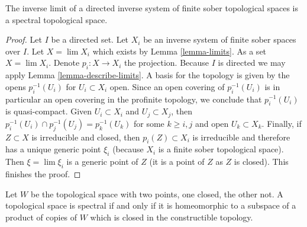 \begin{lemma}
\label{lemma-directed-inverse-limit-finite-sober-spectral-spaces}
The inverse limit of a directed inverse system of finite sober
topological spaces is a spectral topological space.
\end{lemma}

\begin{proof}
Let $I$ be a directed set. Let $X_i$ be an inverse
system of finite sober spaces over $I$. Let $X = \lim X_i$ which exists
by Lemma \ref{lemma-limits}. As a set $X = \lim X_i$. Denote
$p_i : X \to X_i$ the projection.
Because $I$ is directed we may apply Lemma \ref{lemma-describe-limits}.
A basis for the topology is given by the opens
$p_i^{-1}(U_i)$ for $U_i \subset X_i$ open. Since an open covering of
$p_i^{-1}(U_i)$ is in particular an open covering in the profinite
topology, we conclude that $p_i^{-1}(U_i)$ is quasi-compact.
Given $U_i \subset X_i$ and $U_j \subset X_j$, then
$p_i^{-1}(U_i) \cap p_j^{-1}(U_j) = p_k^{-1}(U_k)$
for some $k \geq i, j$ and open $U_k \subset X_k$. Finally, if $Z \subset X$
is irreducible and closed, then $p_i(Z) \subset X_i$ is irreducible
and therefore has a unique generic point $\xi_i$ (because $X_i$
is a finite sober topological space). Then $\xi = \lim \xi_i$ is a
generic point of $Z$ (it is a point of $Z$ as $Z$ is closed).
This finishes the proof.
\end{proof}

\begin{lemma}
\label{lemma-spectral-closed-in-product-two-point-space}
Let $W$ be the topological space with two points, one closed,
the other not. A topological space is spectral if and only if
it is homeomorphic to a subspace of a product of
copies of $W$ which is closed in the constructible topology.
\end{lemma}

